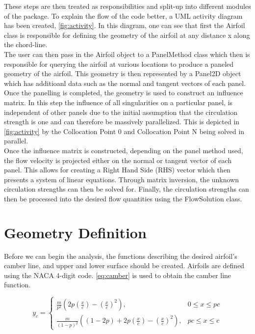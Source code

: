 These steps are then treated as responsibilities and split-up into different
modules of the \numfoil package. To explain the flow of the code better, a UML
activity diagram has been created, \cref{fig:activity}. In this diagram, one
can see that first the \textsf{Airfoil} class is responsible for defining the
geometry of the airfoil at any distance x along the chord-line. \\

The user can then pass in the \textsf{Airfoil} object to a \textsf{PanelMethod}
class which then is responsible for querying the airfoil at various locations
to produce a paneled geometry of the airfoil. This geometry is then represented
by a \textsf{Panel2D} object which has additioanl data such as the normal and
tangent vectors of each panel. Once the panelling is completed, the geometry is
used to construct an influence matrix. In this step the influence of all
singularities on a particular panel, is independent of other panels due to the
initial assumption that the circulation strength is one and can therefore be
massively parallelized. This is depicted in \cref{fig:activity} by the
Collocation Point 0 and Collocation Point N being solved in parallel.\\

Once the influence matrix is constructed, depending on the panel method used,
the flow velocity is projected either on the normal or tangent vector of each
panel. This allows for creating a Right Hand Side (RHS) vector which then
presents a system of linear equations. Through matrix inversion, the unknown
circulation strengths can then be solved for. Finally, the circulation
strengths can then be processed into the desired flow quantities using the
\textsf{FlowSolution} class.

\section{Geometry Definition}
Before we can begin the analysis, the functions describing the desired
airfoil's camber line, and upper and lower surface should be created. Airfoils
are defined using the NACA 4-digit code. \autoref{eq:camber} is used to obtain
the camber line function.

\begin{equation}
\label{eq:camber}
    y_{c}=\left\{
        \begin{array}{ll}
            \frac{m}{p^{2}}\left(2 p\left(\frac{x}{c}\right)-\left(\frac{x}{c}\right)^{2}\right),
            & 0 \leq x \leq p c \\
            \frac{m}{(1-p)^{2}}\left((1-2 p)+2 p\left(\frac{x}{c}\right)-\left(\frac{x}{c}\right)^{2}\right),
            & p c \leq x \leq c
        \end{array}\right.
\end{equation}
\medskip

